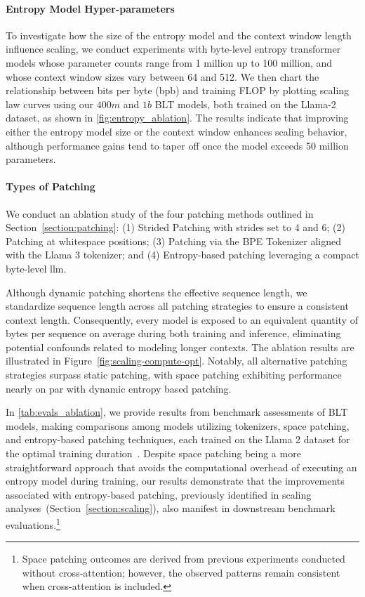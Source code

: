 \paragraph{Entropy Model Hyper-parameters} To investigate how the size of the entropy model and the context window length influence scaling, we conduct experiments with byte-level entropy transformer models whose parameter counts range from 1 million up to 100 million, and whose context window sizes vary between 64 and 512. We then chart the relationship between bits per byte (bpb) and training FLOP by plotting scaling law curves using our $400m$ and $1b$ {\textsc BLT} models, both trained on the Llama-2 dataset, as shown in \autoref{fig:entropy_ablation}. The results indicate that improving either the entropy model size or the context window enhances scaling behavior, although performance gains tend to taper off once the model exceeds 50 million parameters.

\paragraph{Types of Patching}

We conduct an ablation study of the four patching methods outlined in Section~\ref{section:patching}: (1) Strided Patching with strides set to 4 and 6; (2) Patching at whitespace positions; (3) Patching via the BPE Tokenizer aligned with the Llama 3 tokenizer; and (4) Entropy-based patching leveraging a compact byte-level llm.

Although dynamic patching shortens the effective sequence length, we standardize sequence length across all patching strategies to ensure a consistent context length. Consequently, every model is exposed to an equivalent quantity of bytes per sequence on average during both training and inference, eliminating potential confounds related to modeling longer contexts. The ablation results are illustrated in Figure~\ref{fig:scaling-compute-opt}. Notably, all alternative patching strategies surpass static patching, with space patching exhibiting performance nearly on par with dynamic entropy based patching.

In \autoref{tab:evals_ablation}, we provide results from benchmark assessments of {\textsc BLT} models, making comparisons among models utilizing tokenizers, space patching, and entropy-based patching techniques, each trained on the Llama 2 dataset for the optimal training duration~\citep{dubey2024llama}. Despite space patching being a more straightforward approach that avoids the computational overhead of executing an entropy model during training, our results demonstrate that the improvements associated with entropy-based patching, previously identified in scaling analyses~(Section~\ref{section:scaling}), also manifest in downstream benchmark evaluations.\footnote{Space patching outcomes are derived from previous experiments conducted without cross-attention; however, the observed patterns remain consistent when cross-attention is included.}

